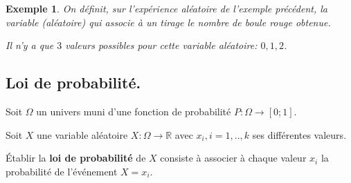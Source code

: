 \documentclass[a4paper,11pt]{article}
\theoremstyle{break}
\newcounter{enonce}
\newtheorem{exemple}[enonce]{Exemple}
\begin{document}
  
  
    \begin{exemple}
   
   On définit, sur l'expérience aléatoire de l'exemple précédent, la variable (aléatoire) qui
   associe à un tirage le nombre de boule rouge obtenue.
   
   Il n'y a que $3$ valeurs possibles pour cette variable aléatoire: $0,1,2$.
  
   \end{exemple}
  
  
  \subsection{Loi de probabilité.}
  
  
  \begin{definition} 
    
   Soit $\Omega$ un univers muni d'une fonction de probabilité $P:\Omega \to [0;1]$.
   
   Soit $X$ une variable aléatoire $X:\Omega \to \mathbb{R}$ avec $x_i,i=1,..,k$ ses différentes 
   valeurs.
   
   \'Etablir la \textbf{loi de probabilité} de $X$ consiste à associer à chaque valeur $x_i$ la probabilité
   de l'événement $X=x_i$.
   
   \end{definition}
   
\end{document}
